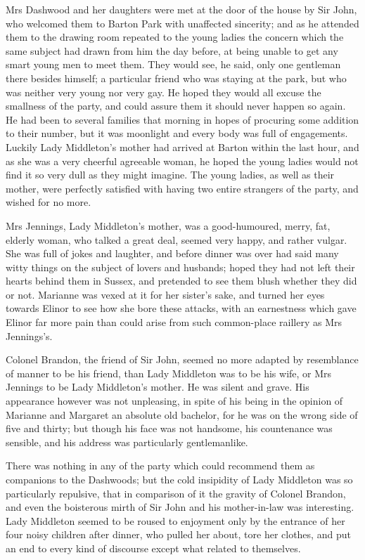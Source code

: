 Mrs Dashwood and her daughters were met at the door of the house by Sir John, who welcomed them to Barton Park with unaffected sincerity; and as he attended them to the drawing room repeated to the young ladies the concern which the same subject had drawn from him the day before, at being unable to get any smart young men to meet them. They would see, he said, only one gentleman there besides himself; a particular friend who was staying at the park, but who was neither very young nor very gay. He hoped they would all excuse the smallness of the party, and could assure them it should never happen so again. He had been to several families that morning in hopes of procuring some addition to their number, but it was moonlight and every body was full of engagements. Luckily Lady Middleton's mother had arrived at Barton within the last hour, and as she was a very cheerful agreeable woman, he hoped the young ladies would not find it so very dull as they might imagine. The young ladies, as well as their mother, were perfectly satisfied with having two entire strangers of the party, and wished for no more.

Mrs Jennings, Lady Middleton's mother, was a good-humoured, merry, fat, elderly woman, who talked a great deal, seemed very happy, and rather vulgar. She was full of jokes and laughter, and before dinner was over had said many witty things on the subject of lovers and husbands; hoped they had not left their hearts behind them in Sussex, and pretended to see them blush whether they did or not. Marianne was vexed at it for her sister's sake, and turned her eyes towards Elinor to see how she bore these attacks, with an earnestness which gave Elinor far more pain than could arise from such common-place raillery as Mrs Jennings's.

Colonel Brandon, the friend of Sir John, seemed no more adapted by resemblance of manner to be his friend, than Lady Middleton was to be his wife, or Mrs Jennings to be Lady Middleton's mother. He was silent and grave. His appearance however was not unpleasing, in spite of his being in the opinion of Marianne and Margaret an absolute old bachelor, for he was on the wrong side of five and thirty; but though his face was not handsome, his countenance was sensible, and his address was particularly gentlemanlike.

There was nothing in any of the party which could recommend them as companions to the Dashwoods; but the cold insipidity of Lady Middleton was so particularly repulsive, that in comparison of it the gravity of Colonel Brandon, and even the boisterous mirth of Sir John and his mother-in-law was interesting. Lady Middleton seemed to be roused to enjoyment only by the entrance of her four noisy children after dinner, who pulled her about, tore her clothes, and put an end to every kind of discourse except what related to themselves.

